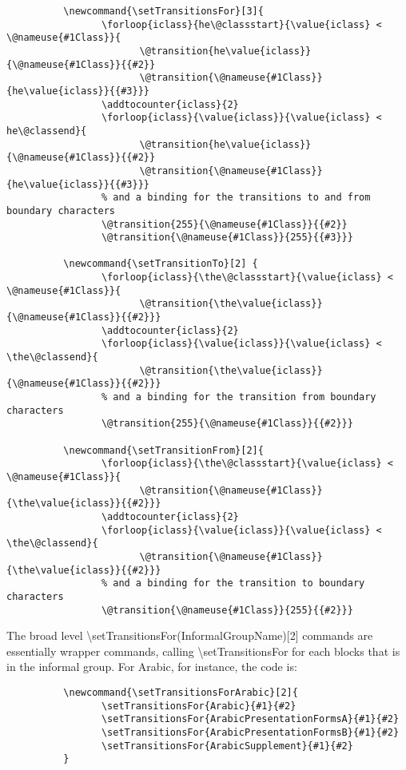 ﻿\documentclass{article}
\begin{document}
		\disableTransitionRules
		\begin{verbatim}
　　　　　　\newcommand{\setTransitionsFor}[3]{
　　　　　　　　　　\forloop{iclass}{he\@classstart}{\value{iclass} < \@nameuse{#1Class}}{
　　　　　　　　　　　　　　\@transition{he\value{iclass}}{\@nameuse{#1Class}}{{#2}}
　　　　　　　　　　　　　　\@transition{\@nameuse{#1Class}}{he\value{iclass}}{{#3}}}
　　　　　　　　　　\addtocounter{iclass}{2}
　　　　　　　　　　\forloop{iclass}{\value{iclass}}{\value{iclass} < he\@classend}{
　　　　　　　　　　　　　　\@transition{he\value{iclass}}{\@nameuse{#1Class}}{{#2}}
　　　　　　　　　　　　　　\@transition{\@nameuse{#1Class}}{he\value{iclass}}{{#3}}}
　　　　　　　　　　% and a binding for the transitions to and from boundary characters
　　　　　　　　　　\@transition{255}{\@nameuse{#1Class}}{{#2}}
　　　　　　　　　　\@transition{\@nameuse{#1Class}}{255}{{#3}}}
　　　　　　
　　　　　　\newcommand{\setTransitionTo}[2] {
　　　　　　　　　　\forloop{iclass}{\the\@classstart}{\value{iclass} < \@nameuse{#1Class}}{
　　　　　　　　　　　　　　\@transition{\the\value{iclass}}{\@nameuse{#1Class}}{{#2}}}
　　　　　　　　　　\addtocounter{iclass}{2}
　　　　　　　　　　\forloop{iclass}{\value{iclass}}{\value{iclass} < \the\@classend}{
　　　　　　　　　　　　　　\@transition{\the\value{iclass}}{\@nameuse{#1Class}}{{#2}}}
　　　　　　　　　　% and a binding for the transition from boundary characters
　　　　　　　　　　\@transition{255}{\@nameuse{#1Class}}{{#2}}}						
　　　　　　
　　　　　　\newcommand{\setTransitionFrom}[2]{
　　　　　　　　　　\forloop{iclass}{\the\@classstart}{\value{iclass} < \@nameuse{#1Class}}{
　　　　　　　　　　　　　　\@transition{\@nameuse{#1Class}}{\the\value{iclass}}{{#2}}}
　　　　　　　　　　\addtocounter{iclass}{2}
　　　　　　　　　　\forloop{iclass}{\value{iclass}}{\value{iclass} < \the\@classend}{
　　　　　　　　　　　　　　\@transition{\@nameuse{#1Class}}{\the\value{iclass}}{{#2}}}
　　　　　　　　　　% and a binding for the transition to boundary characters
　　　　　　　　　　\@transition{\@nameuse{#1Class}}{255}{{#2}}}
		\end{verbatim}
		\enableTransitionRules
		
		The broad level \textbackslash setTransitionsFor(InformalGroupName)[2] commands are essentially wrapper commands, calling \textbackslash setTransitionsFor for each blocks that is in the informal group. For Arabic, for instance, the code is:
		
		\disableTransitionRules
		\begin{verbatim}
　　　　　　\newcommand{\setTransitionsForArabic}[2]{
　　　　　　　　　　\setTransitionsFor{Arabic}{#1}{#2}
　　　　　　　　　　\setTransitionsFor{ArabicPresentationFormsA}{#1}{#2}
　　　　　　　　　　\setTransitionsFor{ArabicPresentationFormsB}{#1}{#2}
　　　　　　　　　　\setTransitionsFor{ArabicSupplement}{#1}{#2}
　　　　　　}
		\end{verbatim}
		\enableTransitionRules
		
\end{document}
